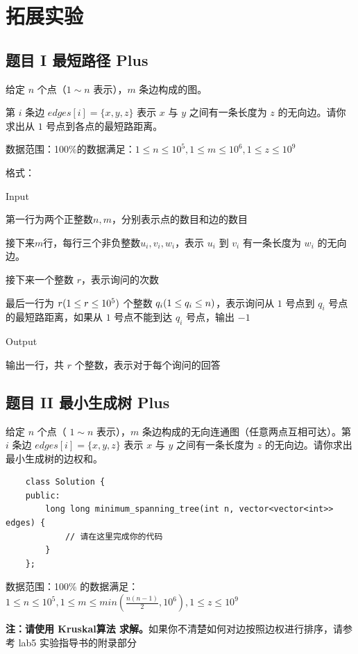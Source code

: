 \documentclass[12pt,a4paper]{article}
\begin{document}
\section{拓展实验}

\subsection{题目 I 最短路径 Plus}

给定 $n$ 个点（$1 ∼ n$ 表示），$m$ 条边构成的图。

第 $i$ 条边 $edges[i] = \{x, y, z\}$ 表示 $x$ 与 $y$ 之间有一条长度为 $z$ 的无向边。请你求出从 $1$ 号点到各点的最短路距离。

数据范围：100\%的数据满足：$1\leq n \leq 10^5, 1\leq m \leq 10^6, 1\leq z\leq 10^9$

格式：

Input

第一行为两个正整数$n,m$，分别表示点的数目和边的数目

接下来$m$行，每行三个非负整数$u_i, v_i, w_i$，表示 $u_i$ 到 $v_i$ 有一条长度为 $w_i$ 的无向边。

接下来一个整数 $r$，表示询问的次数

最后一行为 $r \space (1 \leq r \leq 10^5)$ 个整数 $q_i \space (1 \leq q_i \leq n)$，表示询问从 $1$ 号点到 $q_i$ 号点的最短路距离，如果从 $1$ 号点不能到达 $q_i$ 号点，输出 $-1$

Output

输出一行，共 $r$ 个整数，表示对于每个询问的回答

\subsection{题目 II 最小生成树 Plus}

给定 $n$ 个点（ $1\sim n$ 表示），$m$ 条边构成的无向连通图（任意两点互相可达）。第 $i$ 条边 $edges[i] = \{x, y, z\}$ 表示 $x$ 与 $y$ 之间有一条长度为 $z$ 的无向边。请你求出最小生成树的边权和。

\begin{lstlisting}
    class Solution {
    public:
        long long minimum_spanning_tree(int n, vector<vector<int>> edges) {
            // 请在这里完成你的代码
        }
    };
\end{lstlisting}

数据范围：100\% 的数据满足：$1\le n \le 10^5, 1 \le m \le min(\frac{n(n-1)}{2}, 10^6), 1 \le z \le 10^9$

\textbf{注：请使用 Kruskal算法 求解。}如果你不清楚如何对边按照边权进行排序，请参考 lab5 实验指导书的附录部分
\end{document}

